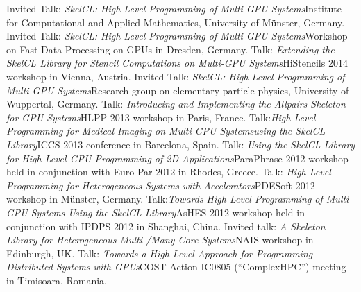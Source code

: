 \documentclass[11pt,a4paper]{moderncv}
\begin{document}
         {Invited Talk: \emph{SkelCL\@: High-Level Programming of Multi-GPU
          Systems}\newline \small Institute for Computational and Applied
          Mathematics, University of Münster, Germany.}
         {Invited Talk: \emph{SkelCL\@: High-Level Programming of Multi-GPU
          Systems}\newline \small Workshop on Fast Data Processing on GPUs in
          Dresden, Germany.}
         {Talk: \emph{Extending the SkelCL Library for Stencil
          Computations on Multi-GPU Systems}\newline \small HiStencils 2014
          workshop in Vienna, Austria.}
         {Invited Talk: \emph{SkelCL\@: High-Level Programming of Multi-GPU
          Systems}\newline \small Research group on elementary particle physics,
          University of Wuppertal, Germany.}
         {Talk: \emph{Introducing and Implementing the Allpairs Skeleton for GPU
          Systems}\newline \small HLPP 2013 workshop in Paris, France.}
         {Talk:\emph{High-Level Programming for Medical Imaging on Multi-GPU
          Systems\newline using the SkelCL Library}\newline \small ICCS 2013 conference in
          Barcelona, Spain.}
       {Talk: \emph{Using the SkelCL Library for High-Level GPU Programming of
        2D Applications}\newline \small ParaPhrase 2012 workshop held in
        conjunction with Euro-Par 2012 in Rhodes, Greece.}
       {Talk: \emph{High-Level Programming for Heterogeneous Systems with
        Accelerators}\newline \small PDESoft 2012 workshop in Münster, Germany.}
       {Talk:\emph{Towards High-Level Programming of Multi-GPU Systems Using
        the SkelCL Library}\newline \small AsHES 2012 workshop held in
        conjunction with IPDPS 2012 in Shanghai, China.}
       {Invited talk: \emph{A Skeleton Library for Heterogeneous
        Multi-/Many-Core Systems}\newline \small NAIS workshop in Edinburgh, UK.}
       {Talk: \emph{Towards a High-Level Approach for Programming Distributed
        Systems with GPUs}\newline \small COST Action IC0805 (``ComplexHPC'')
        meeting in Timisoara, Romania.}
\end{document}
